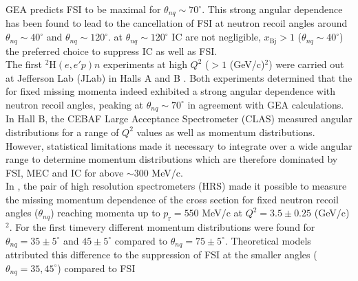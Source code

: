 GEA predicts FSI to be maximal for $\theta_{nq}\sim70^{\circ}$. This strong angular dependence has been found to lead to the cancellation of FSI at neutron recoil angles around $\theta_{nq}\sim40^{\circ}$ and $\theta_{nq}\sim120^{\circ}$. \DIFdelbegin {}\DIFdelend \DIFaddbegin {}\DIFaddend at
$\theta_{nq}\sim120^{\circ}$ \DIFaddbegin {}\DIFaddend IC are not negligible, \DIFaddbegin {}\DIFaddend $x_{\mathrm{Bj}}>1$ (\DIFdelbegin {}\DIFdelend $\theta_{nq}\sim40^{\circ}$) \DIFdelbegin {}\DIFdelend \DIFaddbegin {}\DIFaddend the preferred choice to suppress IC as well as FSI. \\
\indent The first $^{2}\mathrm{H}(e,e'p)n$ experiments at high $Q^{2}$ ($>1$ (GeV/c)$^{2}$) were carried out at Jefferson Lab (JLab) in Halls A \cite{PhysRevLett.107.262501} and B \cite{PhysRevLett.98.262502}. Both
experiments determined that the \DIFdelbegin {}\DIFdelend \DIFaddbegin {}\DIFaddend for fixed missing momenta indeed exhibited a strong angular dependence with neutron recoil angles, peaking
at $\theta_{nq} \sim 70^{\circ}$ in agreement with GEA \cite{Sargsian_2001,PhysRevC.56.1124} calculations. In Hall B, the CEBAF Large Acceptance Spectrometer (CLAS) measured angular
distributions for  a range of $Q^2$ values as well as momentum distributions. However, statistical limitations made it necessary to integrate over a wide angular range to determine momentum distributions
which are therefore dominated by  FSI, MEC and IC for \DIFdelbegin {}\DIFdelend \DIFaddbegin {}\DIFaddend above $\sim 300$ MeV/c. \\
\indent In \DIFdelbegin {}\DIFdelend \DIFaddbegin {}\DIFaddend , the pair of high resolution spectrometers (HRS) made it possible to measure the missing momentum dependence of the cross section for fixed neutron recoil angles ($\theta_{nq}$)
reaching \DIFdelbegin {}\DIFdelend \DIFaddbegin {}\DIFaddend momenta up to $p_{\mathrm{r}}=550$ MeV/c at $Q^{2}=3.5\pm0.25$ (GeV/c)$^{2}$. For the first time\DIFaddbegin \DIFadd{, }\DIFaddend very different momentum distributions were found for $\theta_{nq}=35\pm5^{\circ}$
and $45\pm5^{\circ}$ compared to  $\theta_{nq}=75\pm5^{\circ}$. Theoretical models attributed this difference  to the suppression of FSI at the smaller angles ($\theta_{nq}=35, 45^{\circ}$) compared to FSI
